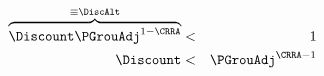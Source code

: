 \begin{eqnarray}
\overbrace{\Discount \PGrouAdj^{1-\CRRA} }^{\equiv \DiscAlt} & < & 1 \label{eq:FVAC}
\\ \Discount & < & \PGrouAdj^{\CRRA-1}  
\end{eqnarray}
